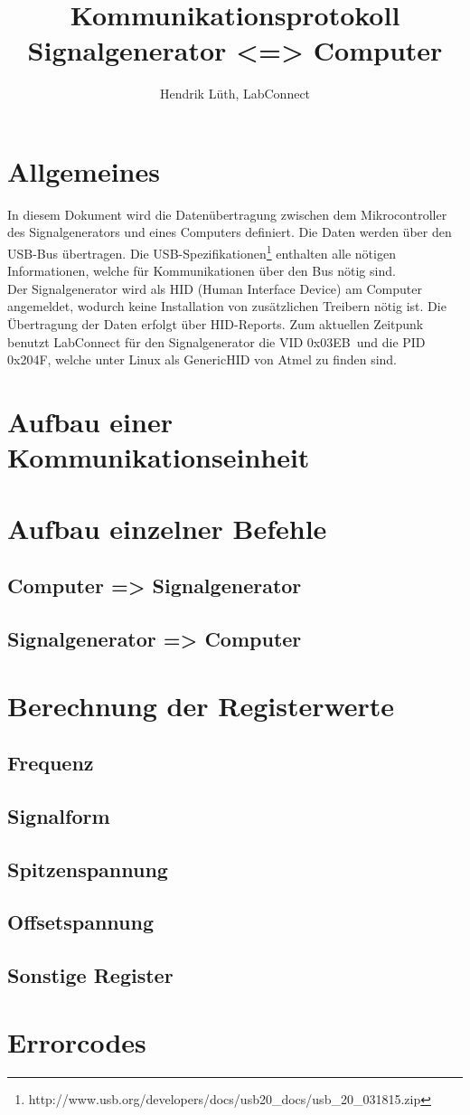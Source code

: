 \documentclass[a4paper,12pt]{article}
\title{Kommunikationsprotokoll \\Signalgenerator <=> Computer}
\author{Hendrik Lüth, LabConnect}
\newcommand{\VID}{0x03EB}
\newcommand{\PID}{0x204F}
\begin{document}
\maketitle
\tableofcontents
\pagebreak

\section{Allgemeines}
In diesem Dokument wird die Datenübertragung zwischen dem Mikrocontroller des Signalgenerators und eines Computers definiert. Die Daten werden über den USB-Bus übertragen. Die USB-Spezifikationen\footnote{http://www.usb.org/developers/docs/usb20\_docs/usb\_20\_031815.zip} enthalten alle nötigen Informationen, welche für Kommunikationen über den Bus nötig sind.\\
Der Signalgenerator wird als HID (Human Interface Device) am Computer angemeldet, wodurch keine Installation von zusätzlichen Treibern nötig ist. Die Übertragung der Daten erfolgt über HID-Reports. Zum aktuellen Zeitpunk benutzt LabConnect für den Signalgenerator die VID \VID\ und die PID \PID, welche unter Linux als GenericHID von Atmel zu finden sind.\\


\section{Aufbau einer Kommunikationseinheit}
\section{Aufbau einzelner Befehle}
\subsection{Computer => Signalgenerator}
\subsection{Signalgenerator => Computer}
\section{Berechnung der Registerwerte}
\subsection{Frequenz}
\subsection{Signalform}
\subsection{Spitzenspannung}
\subsection{Offsetspannung}
\subsection{Sonstige Register}
\section{Errorcodes}
\end{document}

